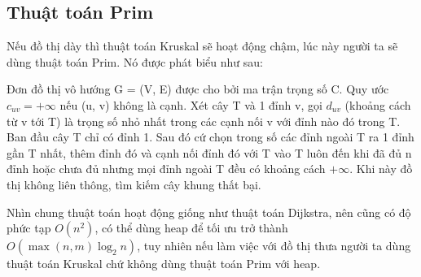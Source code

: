\subsection{Thuật toán Prim}
Nếu đồ thị dày thì thuật toán Kruskal sẽ hoạt động chậm, lúc này người ta sẽ dùng thuật toán Prim. Nó được phát biểu như sau:

Đơn đồ thị vô hướng G = (V, E) được cho bởi ma trận trọng số C. Quy ước $c_{uv}=+\infty$ nếu (u, v) không là cạnh. Xét cây T và 1 đỉnh v, gọi $d_{uv}$ (khoảng cách từ v tới T) là trọng số nhỏ nhất trong các cạnh nối v với đỉnh nào đó trong T. Ban đầu cây T chỉ có đỉnh 1. Sau đó cứ chọn trong số các đỉnh ngoài T ra 1 đỉnh gần T nhất, thêm đỉnh đó và cạnh nối đỉnh đó với T vào T luôn đến khi đã đủ n đỉnh hoặc chưa đủ nhưng mọi đỉnh ngoài T đều có khoảng cách $+\infty$. Khi này đồ thị không liên thông, tìm kiếm cây khung thất bại.

Nhìn chung thuật toán hoạt động giống như thuật toán Dijkstra, nên cũng có độ phức tạp $O(n^2)$, có thể dùng heap để tối ưu trở thành $O(\max(n,m)\log_2n)$, tuy nhiên nếu làm việc với đồ thị thưa người ta dùng thuật toán Kruskal chứ không dùng thuật toán Prim với heap.